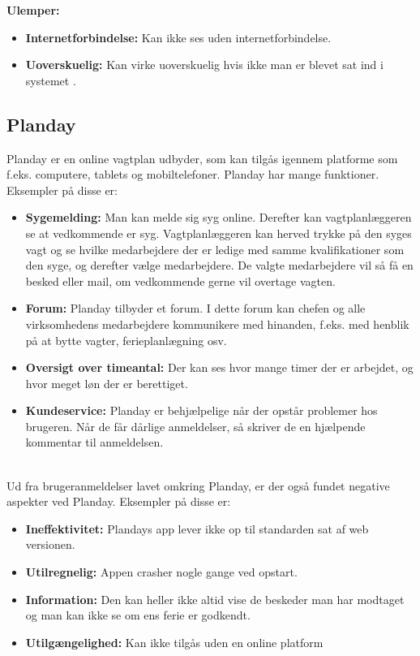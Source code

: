 \textbf{Ulemper: }
\begin{itemize}
\item {\textbf{Internetforbindelse:} Kan ikke ses uden internetforbindelse.}
\item {\textbf{Uoverskuelig:} Kan virke uoverskuelig hvis ikke man er blevet sat ind i systemet \citep{Tamigo, Trustpilot}.}
\end{itemize}

\subsection{Planday}
Planday er en online vagtplan udbyder, som kan tilgås igennem platforme som f.eks. computere, tablets og mobiltelefoner. Planday har mange funktioner. Eksempler på disse er:
\begin{itemize}
\item {\textbf{Sygemelding:} Man kan melde sig syg online. Derefter kan vagtplanlæggeren se at vedkommende er syg. Vagtplanlæggeren kan herved trykke på den syges vagt og se hvilke medarbejdere der er ledige med samme kvalifikationer som den syge, og derefter vælge medarbejdere. De valgte medarbejdere vil så få en besked eller mail, om vedkommende gerne vil overtage vagten.}
\item {\textbf{Forum:} Planday tilbyder et forum. I dette forum kan chefen og alle virksomhedens medarbejdere kommunikere med hinanden, f.eks. med henblik på at bytte vagter, ferieplanlægning osv.}
\item {\textbf{Oversigt over timeantal:} Der kan ses hvor mange timer der er arbejdet, og hvor meget løn der er berettiget.}
\item {\textbf{Kundeservice:} Planday er behjælpelige når der opstår problemer hos brugeren. Når de får dårlige anmeldelser, så skriver de en hjælpende kommentar til anmeldelsen.} 
\end{itemize} 
\citep{DanskInternetHandel, Simonsen2014, Planday}\\

\noindent Ud fra brugeranmeldelser lavet omkring Planday, er der også fundet negative aspekter ved Planday. Eksempler på disse er:
\begin{itemize}
\item {\textbf{Ineffektivitet:} Plandays app lever ikke op til standarden sat af web versionen.} 
\item {\textbf{Utilregnelig:} Appen crasher nogle gange ved opstart.}
\item {\textbf{Information:} Den kan heller ikke altid vise de beskeder man har modtaget og man kan ikke se om ens ferie er godkendt.} 
\item {\textbf{Utilgængelighed:} Kan ikke tilgås uden en online platform} \end{itemize}
\citep{Play}\\

